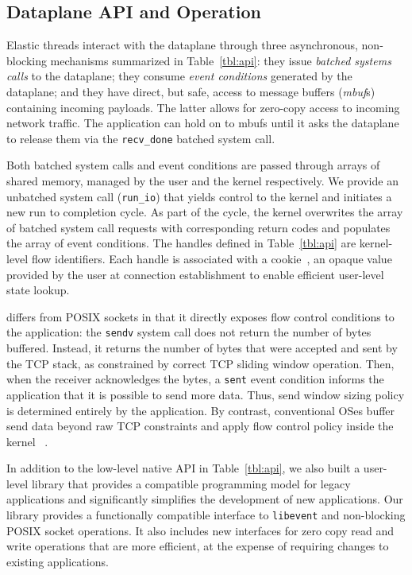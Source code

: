 \subsection{Dataplane API and Operation}
\label{sec:impl:api}

Elastic threads interact with the \ix dataplane through three
asynchronous, non-blocking mechanisms summarized in
Table~\ref{tbl:api}: they issue \emph{batched systems calls} to the
dataplane; they consume \emph{event conditions} generated by the
dataplane; and they have direct, but safe, access to message buffers
(\emph{mbuf}s) containing incoming payloads.  The latter allows
for zero-copy access to incoming network traffic.  The application
can hold on to mbufs until it asks the dataplane to
release them via the \texttt{recv\_done} batched system call.

Both batched system calls and event conditions are passed through
arrays of shared memory, managed by the user and the kernel
respectively.  We provide an unbatched system call
(\texttt{run\_io}) that yields control to the kernel and initiates a new run
to completion cycle. As part of the
cycle, the kernel overwrites the array of batched system call requests with
corresponding return codes and populates the array of event conditions.
The handles defined in Table~\ref{tbl:api} are kernel-level flow identifiers. Each handle is
associated with a cookie~\cite{DBLP:conf/osdi/HanMCR12}, an opaque value
provided by the user at connection establishment to enable efficient
user-level state lookup. %

\ix differs from POSIX sockets in that it directly exposes flow
control conditions to the application: the \texttt{sendv} system call
does not return the number of bytes buffered. Instead, it returns the
number of bytes that were accepted and sent by the TCP stack, as
constrained by correct TCP sliding window operation. Then, when the
receiver acknowledges the bytes, a \texttt{sent} event
condition informs the application that it is possible to send more
data. Thus, send window sizing policy is determined entirely by the
application.  By contrast, conventional OSes buffer send data beyond
raw TCP constraints and apply flow control policy inside the kernel
~\cite{dynamicwindow}.

In addition to the low-level native \ix API in Table~\ref{tbl:api}, we
also built a user-level library that provides a compatible programming
model for legacy applications and significantly simplifies the
development of new applications. Our library provides a functionally
compatible interface to \texttt{libevent} and non-blocking POSIX
socket operations. It also includes new interfaces for zero copy read
and write operations that are more efficient, at the expense of
requiring changes to existing applications. 


